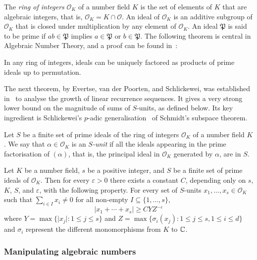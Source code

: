 The \emph{ring of integers} $\mathcal{O}_{K}$ of a number field $K$ is the set of elements of $K$ that are algebraic integers, that is, $\mathcal{O}_{K}=K\cap\mathcal{O}$.
An ideal of $\mathcal{O}_{K}$ is an additive subgroup of $\mathcal{O}_{K}$ that is closed under multiplication by any element of $\mathcal{O}_{K}$. An ideal $\mathfrak{P}$ is said to be prime if $ab\in \mathfrak{P}$ implies $a\in\mathfrak{P}$ or $b\in\mathfrak{P}$. The following theorem is central in Algebraic Number Theory, and a proof can be found in~\cite{SnT}:

\begin{theorem}
In any ring of integers, ideals can be uniquely factored as products of prime ideals up to permutation.
\end{theorem}

The next theorem, by Evertse, van der Poorten, and Schlickewei, was established in~\cite{Evertse84,PS82} to analyse the growth of linear recurrence sequences. It gives a very strong lower bound on the magnitude of sums of $S$-units, as defined below. Its key ingredient is Schlickewei's $p$-adic generalisation~\cite{Sch77} of Schmidt's subspace theorem.

Let $S$ be a finite set of prime ideals of the ring of integers
$\mathcal{O}_{K}$ of a number field $K$. We say that
$\alpha \in \mathcal{O}_{K}$ is an \emph{$S$-unit} if all the ideals
appearing in the prime factorisation of $(\alpha)$, that is, the principal ideal in $\mathcal{O}_{K}$ generated by $\alpha$, are in $S$.

\begin{theorem}[$S$-units]
\label{thm:s-units}
Let $K$ be a number field, $s$ be a positive integer, and $S$ be a
finite set of prime ideals of $\mathcal{O}_{K}$. Then for every
$\varepsilon>0$ there exists a constant $C$, depending only on $s$,
$K$, $S$, and $\varepsilon$, with the following property. For every
set of $S$-units $x_1,\ldots,x_s\in\mathcal{O}_{K}$ such that
$\sum\limits_{i\in I} x_i\neq 0$ for all non-empty $I\subseteq\lbrace 
1,\ldots,s\rbrace$,
\[ \lvert x_1+\cdots+x_s \rvert\geq CYZ^{-\varepsilon} \]
where $Y=\max\lbrace \lvert x_j\rvert : 1\leq j\leq s \rbrace$ and $Z=\max\lbrace \sigma_i(x_j): 1\leq j\leq s,1\leq i\leq d \rbrace$ and $\sigma_i$ represent the different monomorphisms from $K$ to $\mathbb{C}$.
\end{theorem}

\subsubsection{Manipulating algebraic numbers}
\label{sec:alg_num_rep}

